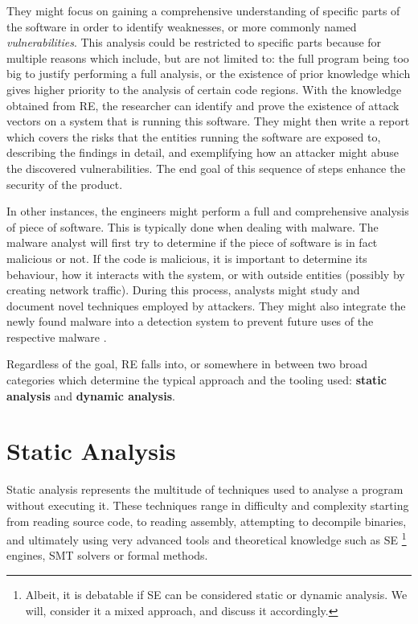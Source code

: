 They might focus on gaining a comprehensive understanding of specific parts of the software in order to identify weaknesses, or more commonly named \emph{vulnerabilities}. This analysis could be restricted to specific parts because for multiple reasons which include, but are not limited to: the full program being too big to justify performing a full analysis, or the existence of prior knowledge which gives higher priority to the analysis of certain code regions. With the knowledge obtained from RE, the researcher can identify and prove the existence of attack vectors on a system that is running this software. They might then write a report which covers the risks that the entities running the software are exposed to, describing the findings in detail, and exemplifying how an attacker might abuse the discovered vulnerabilities. The end goal of this sequence of steps enhance the security of the product.

In other instances, the engineers might perform a full and comprehensive analysis of piece of software. This is typically done when dealing with malware. The malware analyst will first try to determine if the piece of software is in fact malicious or not. If the code is malicious, it is important to determine its behaviour, how it interacts with the system, or with outside entities (possibly by creating network traffic). During this process, analysts might study and document novel techniques employed by attackers. They might also integrate the newly found malware into a detection system to prevent future uses of the respective malware \cite{malware_crowdstrike}.

Regardless of the goal, RE falls into, or somewhere in between two broad categories which determine the typical approach and the tooling used: \textbf{static analysis} and \textbf{dynamic analysis}.

\section{Static Analysis}

Static analysis represents the multitude of techniques used to analyse a program without executing it. These techniques range in difficulty and complexity starting from reading source code, to reading assembly, attempting to decompile binaries, and ultimately using very advanced tools and theoretical knowledge such as \gls{SE} \footnote{Albeit, it is debatable if \gls{SE} can be considered static or dynamic analysis. We will, consider it a mixed approach, and discuss it accordingly.} engines, SMT solvers \cite{z3} or formal methods.

